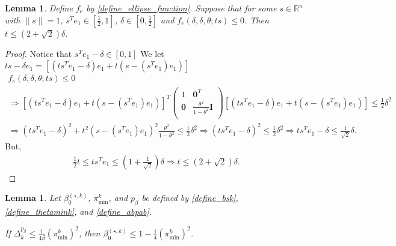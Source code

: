 \documentclass{article}
\newtheorem{lemma}[theorem]{Lemma}
\theoremstyle{case}
\numberwithin{theorem}{subsection}
\newcommand{\bsk}{{\beta_0^{(\star, k)}}}
\newcommand{\dk}{\Delta_k}
\newcommand{\Rn}{\mathbb R^n}
\newcommand{\thetamink}{{\pi^k_{\textrm{min}}}}
\begin{document}
\begin{lemma}
\label{ellipse_fits_part_2}
Define $f_e$ by \cref{define_ellipse_function}.
Suppose that for some $s \in \Rn$ with $\|s\| = 1$, $s^Te_1 \in \left[\frac 1 2, 1\right]$, $\delta \in [0, \frac 1 2]$ and $f_e(\delta, \delta, \theta; ts) \le 0$.
Then $t \le \left(2 + \sqrt{2}\right) \delta$.
\end{lemma}
\begin{proof}
Notice that $s^Te_1 - \delta \in \left[0, 1\right]$
We let $ts - \delta e_1= \left[\left(ts^Te_1 - \delta\right) e_1 + t\left(s - \left(s^Te_1\right) e_1\right)\right]$
\begin{align*}
f_e(\delta, \delta, \theta; ts) \le 0 \\
\Longrightarrow 
\left[\left(ts^Te_1 - \delta\right) e_1 + t\left(s - \left(s^Te_1\right) e_1\right)\right]^T\begin{pmatrix}
1 & \boldsymbol0^T \\
\boldsymbol 0 & \frac{\theta^2}{1 - \theta^2} \boldsymbol I \\
\end{pmatrix}\left[\left(ts^Te_1 - \delta\right) e_1 + t\left(s - \left(s^Te_1\right) e_1\right)\right] \le \frac 1 2 \delta^2 \\
\Longrightarrow
\left(ts^Te_1 - \delta\right)^2 + t^2\left(s - \left(s^Te_1\right) e_1\right)^2  \frac{\theta^2}{1 - \theta^2} \le \frac 1 2 \delta^2
\Longrightarrow 
\left(t s^Te_1 - \delta\right)^2 \le \frac 1 2 \delta^2 
\Longrightarrow t s^Te_1 - \delta \le \frac 1 {\sqrt{2}} \delta.
\end{align*}
But,
\begin{align*}
\frac 1 2 t \le t s^Te_1 \le \left(1 + \frac 1 {\sqrt{2}}\right) \delta
\Longrightarrow t \le \left(2 + \sqrt{2}\right) \delta.
\end{align*}
\end{proof}




\begin{lemma}
\label{boundbsk}
Let $\bsk$, $\thetamink$, and $p_{\beta}$ be defined by \cref{define_bsk}, \cref{define_thetamink}, and \cref{define_abpab}.

If $\dk^{p_{\beta}} \le \frac {1} {4\beta}\left(\thetamink\right)^2$, then $\bsk \le 1 - \frac 1 4 \left(\thetamink\right)^2$.
\end{lemma}
\end{document}
